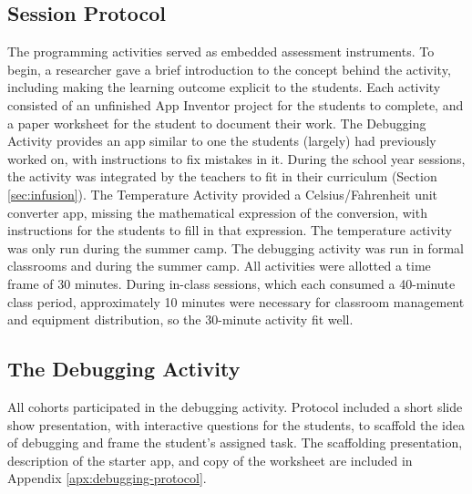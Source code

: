 \subsection{Session Protocol}
The programming activities served as embedded assessment instruments. To begin, a researcher gave a brief introduction to the concept behind the activity, including making the learning outcome explicit to the students. Each activity consisted of an unfinished App Inventor project for the students to complete, and a paper worksheet for the student to document their work. The Debugging Activity provides an app similar to one the students (largely) had previously worked on, with instructions to fix mistakes in it. During the school year sessions, the activity was integrated by the teachers to fit in their curriculum (Section \ref{sec:infusion}). The Temperature Activity provided a Celsius/Fahrenheit unit converter app, missing the mathematical expression of the conversion, with instructions for the students to fill in that expression. The temperature activity was only run during the summer camp. The debugging activity was run in formal classrooms and during the summer camp. All activities were allotted a time frame of 30 minutes. During in-class sessions, which each consumed a 40-minute class period, approximately 10 minutes were necessary for classroom management and equipment distribution, so the 30-minute activity fit well. 




\subsection{The Debugging Activity}
All cohorts participated in the debugging activity. Protocol included a short slide show presentation, with interactive questions for the students, to scaffold the idea of debugging and frame the student's assigned task. The scaffolding presentation, description of the starter app, and copy of the worksheet are included in Appendix \ref{apx:debugging-protocol}.

